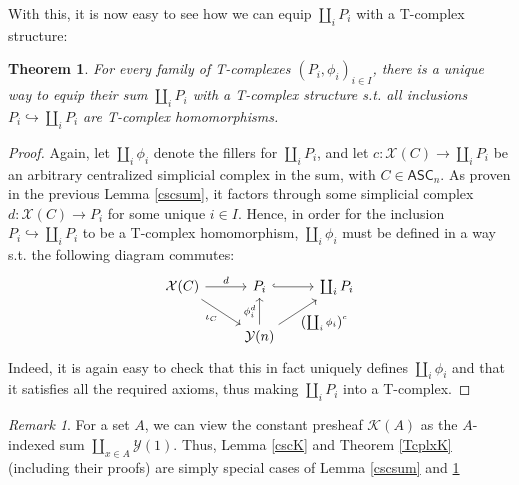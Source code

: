 \documentclass{article}
\newtheorem{theorem}{Theorem}[subsection]
\theoremstyle{remark}
\newtheorem{remark}{Remark}[subsection]
\theoremstyle{definition}
\newcommand{\ASC}{\mathsf{ASC}}
\newcommand{\Y}{\mathcal Y}
\newcommand{\X}{\mathcal X}
\newcommand{\K}{\mathcal K}
\begin{document}
	With this, it is now easy to see how we can equip $\coprod_iP_i$ with a T-complex structure:
	\begin{theorem}\label{Tcplxsum}
		For every family of T-complexes $(P_i,\phi_i)_{i\in I}$, there is a unique way to equip their sum $\coprod_iP_i$ with a T-complex structure s.t. all inclusions $P_i\hookrightarrow\coprod_iP_i$ are T-complex homomorphisms.
	\end{theorem}
	\begin{proof}
		Again, let $\coprod_i\phi_i$ denote the fillers for $\coprod_iP_i$, and let $c:\X(C)\to\coprod_iP_i$ be an arbitrary centralized simplicial complex in the sum, with $C\in\ASC_n$. As proven in the previous Lemma \ref{cscsum}, it factors through some simplicial complex $d:\X(C)\to P_i$ for some unique $i\in I$. Hence, in order for the inclusion $P_i\hookrightarrow\coprod_iP_i$ to be a T-complex homomorphism, $\coprod_i\phi_i$ must be defined in a way s.t. the following diagram commutes:
		\[\begin{tikzcd}
			\X(C)\arrow{r}{d}\arrow{dr}[swap]{\iota_C}&P_i\arrow[hook]{r}&\coprod_iP_i\\
			&\Y(n)\arrow{u}{\phi_i^d}\arrow{ur}[swap]{\left(\coprod_i\phi_i\right)^c}
		\end{tikzcd}\]
		Indeed, it is again easy to check that this in fact uniquely defines $\coprod_i\phi_i$ and that it satisfies all the required axioms, thus making $\coprod_iP_i$ into a T-complex.
	\end{proof}
	\begin{remark}
		For a set $A$, we can view the constant presheaf $\K(A)$ as the $A$-indexed sum $\coprod_{x\in A}\Y(1)$. Thus, Lemma \ref{cscK} and Theorem \ref{TcplxK} (including their proofs) are simply special cases of Lemma \ref{cscsum} and \ref{Tcplxsum}
	\end{remark}
\end{document}
